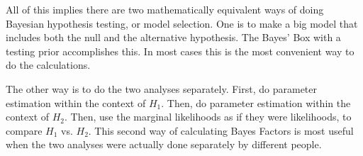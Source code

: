 All of this implies
there are two mathematically equivalent ways of doing Bayesian hypothesis testing,
or model selection. One is to make a big model that includes both the null and
the alternative hypothesis. The Bayes' Box with a testing prior accomplishes this.
In most cases this is the most convenient way to do the calculations.

The other way is to do the two analyses separately. First, do parameter estimation
within the context of $H_1$. Then, do parameter estimation within the context
of $H_2$. Then, use the marginal likelihoods as if they were likelihoods, to
compare $H_1$ vs. $H_2$. This second way of calculating Bayes Factors is
most useful when the two analyses were actually done separately by different
people.



